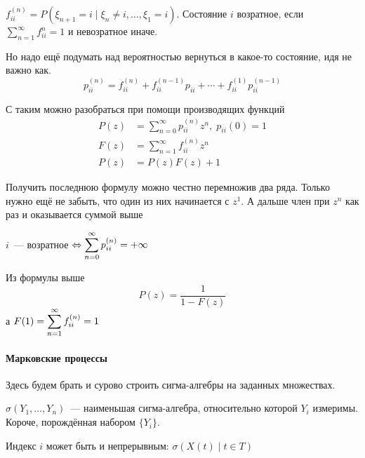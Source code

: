 \documentclass[12pt, timbord]{../../../notes}
\begin{document}
\begin{defn}\label{defn:proc::markchain::ret}
  $f_{ii}^{(n)} = P(\xi_{n+1} = i \mid \xi_{n} \neq i, \dotsc, \xi_1 = i) $. Состояние $i$
  возратное, если $\sum_{n=1}^\infty f_{ii}^n = 1$ и невозратное иначе.
\end{defn}

Но надо ещё подумать над вероятностью вернуться в какое-то состояние, идя не важно как.
\[
  p_{ii}^{(n)} = f_{ii}^{(n)} + f_{ii}^{(n-1)} p_{ii} + \dotsb + f_{ii}^{(1)}p_{ii}^{(n-1)}
\]

С таким можно разобраться при помощи производящих функций
\begin{align*}
  P(z) &= \sum_{n=0}^\infty p_{ii}^{(n)} z^n, \; p_{ii} (0) = 1 \\
  F(z) &= \sum_{n=1}^\infty f_{ii}^{(n)} z^n\\
  P(z) &= P(z) F(z) + 1 
\end{align*}

Получить последнюю формулу можно честно перемножив два ряда. Только нужно ещё не забыть, что один из
них начинается с $z^1$. А дальше член при $z^n$ как раз и оказывается суммой выше

\begin{prop}\label{prop:proc::markchain::retcrit}
  $i$~--- возратное $ \Leftrightarrow \displaystyle\sum_{n=0}^\infty p_{ii}^{(n)} = + \infty$
\end{prop}
\begin{itlproof}
  Из формулы выше
  \[
    P(z) = \frac{1}{1-F(z)}
  \]
  а $F(1) = \displaystyle\sum_{n=1}^\infty f_{ii}^{(n)} = 1$
\end{itlproof}





\paragraph{Марковские процессы} \label{par:proc::mark}

Здесь будем брать и сурово строить сигма-алгебры на заданных множествах.
\begin{defn}\label{defn:proc::mark::gensigma}
  $\sigma(Y_1, \dotsc, Y_n)$~--- наименьшая сигма-алгебра, относительно которой $Y_i$ измеримы. 
  Короче, порождённая набором $\{Y_i\}$.
\end{defn}
\begin{rem*}
  Индекс $i$ может быть и непрерывным: $\sigma(X(t) \mid t \in T)$
\end{rem*}
\end{document}
